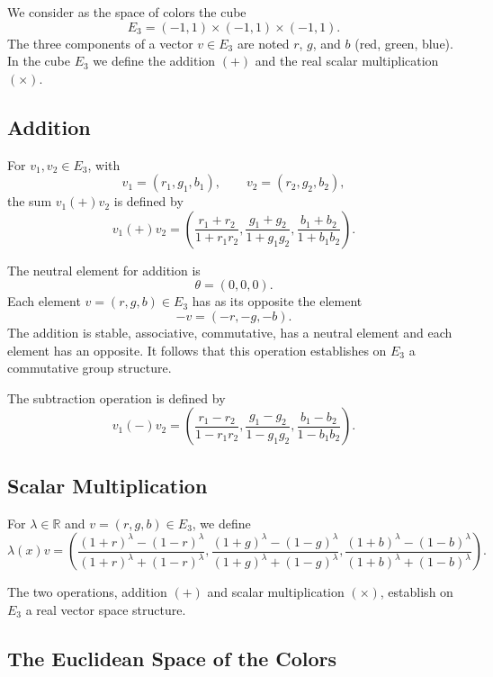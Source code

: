 \documentclass[11pt]{article}
\begin{document}
We consider as the space of colors the cube
\[
E_3 = (-1,1)\times(-1,1)\times(-1,1).
\]
The three components of a vector $v\in E_3$ are noted $r$, $g$, and $b$ (red, green, blue). In the cube $E_3$ we define the addition $(+)$ and the real scalar multiplication $(\times)$.

\subsection{Addition}

For $v_1,v_2\in E_3$, with
\[
v_1=(r_1,g_1,b_1), \qquad v_2=(r_2,g_2,b_2),
\]
the sum $v_1(+ )v_2$ is defined by
\begin{equation}
v_1(+ )v_2=
\left(
\frac{r_1+r_2}{1+r_1r_2},
\frac{g_1+g_2}{1+g_1g_2},
\frac{b_1+b_2}{1+b_1b_2}
\right).
\end{equation}

The neutral element for addition is
\[
\theta=(0,0,0).
\]
Each element $v=(r,g,b)\in E_3$ has as its opposite the element
\[
-v=(-r,-g,-b).
\]
The addition is stable, associative, commutative, has a neutral element and each element has an opposite. It follows that this operation establishes on $E_3$ a commutative group structure.

The subtraction operation is defined by
\begin{equation}
v_1(-)v_2=
\left(
\frac{r_1-r_2}{1-r_1r_2},
\frac{g_1-g_2}{1-g_1g_2},
\frac{b_1-b_2}{1-b_1b_2}
\right).
\end{equation}

\subsection{Scalar Multiplication}

For $\lambda\in\mathbb{R}$ and $v=(r,g,b)\in E_3$, we define
\begin{equation}
\lambda(x)v=
\left(
\frac{(1+r)^\lambda-(1-r)^\lambda}{(1+r)^\lambda+(1-r)^\lambda},
\frac{(1+g)^\lambda-(1-g)^\lambda}{(1+g)^\lambda+(1-g)^\lambda},
\frac{(1+b)^\lambda-(1-b)^\lambda}{(1+b)^\lambda+(1-b)^\lambda}
\right).
\end{equation}

The two operations, addition $(+)$ and scalar multiplication $(\times)$, establish on $E_3$ a real vector space structure.

\subsection{The Euclidean Space of the Colors}
\end{document}
